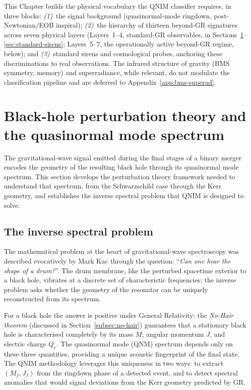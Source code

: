 \documentclass[11pt,a4paper, english]{book}
\theoremstyle{plain}
\theoremstyle{definition}
\numberwithin{equation}{chapter}
\numberwithin{figure}{chapter}
\numberwithin{table}{chapter}
\begin{document}
This Chapter builds the physical vocabulary the QNIM classifier requires, in three blocks: \emph{(1)}~the signal background (quasinormal-mode ringdown, post-Newtonian/EOB inspiral); \emph{(2)}~the hierarchy of thirteen beyond-GR signatures across seven physical layers (Layers~1--4, standard-GR observables, in Sections~\ref{sec:qnm}--\ref{sec:standard-sirens}; Layers~5--7, the operationally active beyond-GR regime, below); and \emph{(3)}~standard sirens and cosmological probes, anchoring these discriminations to real observations. The infrared structure of gravity (BMS symmetry, memory) and superradiance, while relevant, do not modulate the classification pipeline and are deferred to Appendix~\ref{app:bms-superad}.

\section{Black-hole perturbation theory and the quasinormal mode spectrum}
\label{sec:qnm}
The gravitational-wave signal emitted during the final stages of a binary merger encodes the geometry of the resulting black hole through its quasinormal mode spectrum. This section develops the perturbation theory framework needed to understand that spectrum, from the Schwarzschild case through the Kerr geometry, and establishes the inverse spectral problem that QNIM is designed to solve.
\subsection{The inverse spectral problem}
\label{subsec:inverse-spectral}

The mathematical problem at the heart of gravitational-wave spectroscopy
was described evocatively by Mark Kac \cite{Kac_1966} through the question:
``\emph{Can one hear the shape of a drum?}''.  The drum membrane, like
the perturbed spacetime exterior to a black hole, vibrates at a discrete
set of characteristic frequencies; the inverse problem asks whether the
geometry of the resonator can be uniquely reconstructed from its spectrum.

For a black hole the answer is positive under General Relativity: the
\emph{No-Hair theorem} (discussed in Section~\ref{subsec:no-hair}) guarantees
that a stationary black hole is characterised completely by its mass $M$,
angular momentum $J$, and electric charge $Q_e$.  The quasinormal mode (QNM)
spectrum depends only on these three quantities, providing a unique acoustic
fingerprint of the final state.  The QNIM methodology leverages this
uniqueness in two ways: to extract $(M_f, J_f)$ from the ringdown phase of
a detected event, and to detect spectral anomalies that would signal
deviations from the Kerr geometry predicted by GR.
\end{document}
